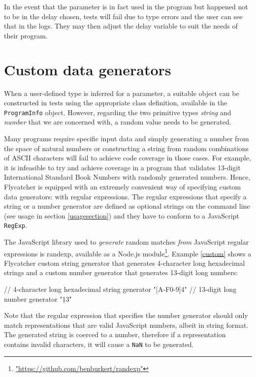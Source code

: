In the event that the parameter is in fact used in the program but happened not to be in the delay chosen, tests will fail due to type errors and the user can see that in the logs. They may then adjust the delay variable to suit the needs of their program.

\section{Custom data generators}
When a user-defined type is inferred for a parameter, a suitable object can be constructed in tests using the appropriate class definition, available in the \texttt{ProgramInfo} object. However, regarding the two primitive types \emph{string} and \emph{number} that we are concerned with, a random value needs to be generated.

Many programs require specific input data and simply generating a number from the space of natural numbers or constructing a string from random combinations of ASCII characters will fail to achieve code coverage in those cases. For example, it is infeasible to try and achieve coverage in a program that validates 13-digit International Standard Book Numbers with randomly generated numbers. Hence, \textsf{Flycatcher} is equipped with an extremely convenient way of specifying custom data generators: with regular expressions. The regular expressions that specify a string or a number generator are defined as optional strings on the command line (see usage in section \ref{usagesection}) and they have to conform to a JavaScript \texttt{RegExp}.

The JavaScript library used to \emph{generate} random matches \emph{from} JavaScript regular expressions is \textsf{randexp}, available as a \textsf{Node.js} module\footnote{\url{"https://github.com/benburkert/randexp"}}. Example \ref{custom} shows a \textsf{Flycatcher} custom string generator that generates 4-character long hexadecimal strings and a custom number generator that generates 13-digit long numbers:

\begin{code}[caption=Custom data generators,label=custom]
// 4-character long hexadecimal string generator
"[A-F0-9]{4}"
// 13-digit long number generator
"\d{13}"
\end{code}

Note that the regular expression that specifies the number generator should only match representations that are valid JavaScript numbers, albeit in string format. The generated string is coerced to a number, therefore if a representation contains invalid characters, it will cause a \texttt{NaN} to be generated.

